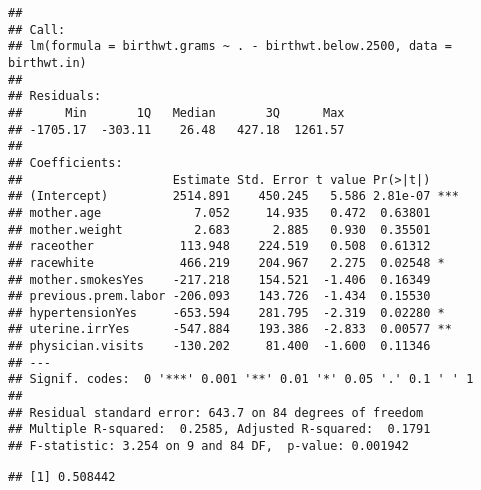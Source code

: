 \documentclass[
]{article}
\newenvironment{Shaded}{\begin{snugshade}}{\end{snugshade}}
\newcommand{\AttributeTok}[1]{\textcolor[rgb]{0.13,0.29,0.53}{#1}}
\newcommand{\FunctionTok}[1]{\textcolor[rgb]{0.13,0.29,0.53}{\textbf{#1}}}
\newcommand{\NormalTok}[1]{#1}
\newcommand{\OtherTok}[1]{\textcolor[rgb]{0.56,0.35,0.01}{#1}}
\newcommand{\SpecialCharTok}[1]{\textcolor[rgb]{0.81,0.36,0.00}{\textbf{#1}}}
\begin{document}
\begin{verbatim}
## 
## Call:
## lm(formula = birthwt.grams ~ . - birthwt.below.2500, data = birthwt.in)
## 
## Residuals:
##      Min       1Q   Median       3Q      Max 
## -1705.17  -303.11    26.48   427.18  1261.57 
## 
## Coefficients:
##                     Estimate Std. Error t value Pr(>|t|)    
## (Intercept)         2514.891    450.245   5.586 2.81e-07 ***
## mother.age             7.052     14.935   0.472  0.63801    
## mother.weight          2.683      2.885   0.930  0.35501    
## raceother            113.948    224.519   0.508  0.61312    
## racewhite            466.219    204.967   2.275  0.02548 *  
## mother.smokesYes    -217.218    154.521  -1.406  0.16349    
## previous.prem.labor -206.093    143.726  -1.434  0.15530    
## hypertensionYes     -653.594    281.795  -2.319  0.02280 *  
## uterine.irrYes      -547.884    193.386  -2.833  0.00577 ** 
## physician.visits    -130.202     81.400  -1.600  0.11346    
## ---
## Signif. codes:  0 '***' 0.001 '**' 0.01 '*' 0.05 '.' 0.1 ' ' 1
## 
## Residual standard error: 643.7 on 84 degrees of freedom
## Multiple R-squared:  0.2585, Adjusted R-squared:  0.1791 
## F-statistic: 3.254 on 9 and 84 DF,  p-value: 0.001942
\end{verbatim}

\begin{Shaded}
\end{Shaded}

\begin{verbatim}
## [1] 0.508442
\end{verbatim}

\begin{Shaded}
\end{Shaded}
\end{document}
